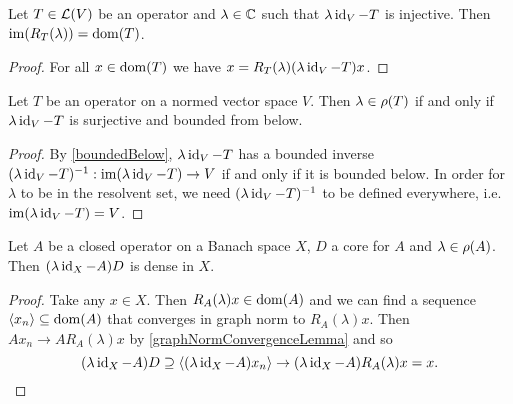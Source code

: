 \begin{lemma}
Let $T\in\operatorname{\mathcal{L}}(V)$ be an operator and $\lambda\in\mathbb{C}$ such that $\lambda\operatorname{id}_V - T$ is injective. Then $\operatorname{im}(R_T(\lambda)) = \operatorname{dom}(T)$.
\end{lemma}
\begin{proof}
For all $x\in \operatorname{dom}(T)$ we have $x = R_T(\lambda)(\lambda\operatorname{id}_V - T)x$.
\end{proof}

\begin{lemma} \label{elementResolventSetNormedSpace}
Let $T$ be an operator on a normed vector space $V$. Then $\lambda \in \rho(T)$ \textup{if and only if} $\lambda \operatorname{id}_V - T$ is surjective and bounded from below.
\end{lemma}
\begin{proof}
By \ref{boundedBelow}, $\lambda \operatorname{id}_V - T$ has a bounded inverse $(\lambda \operatorname{id}_V - T)^{-1}: \operatorname{im}(\lambda \operatorname{id}_V - T)\to V$ if and only if it is bounded below. In order for $\lambda$ to be in the resolvent set, we need $(\lambda \operatorname{id}_V - T)^{-1}$ to be defined everywhere, i.e. $\operatorname{im}(\lambda \operatorname{id}_V - T) = V$.
\end{proof}

\begin{lemma} \label{densityCoreLemma}
Let $A$ be a closed operator on a Banach space $X$, $D$ a core for $A$ and $\lambda\in\rho(A)$. Then $(\lambda\operatorname{id}_X - A)D$ is dense in $X$.
\end{lemma}
\begin{proof}
Take any $x\in X$. Then $R_A(\lambda)x\in \operatorname{dom}(A)$ and we can find a sequence $\left\langle x_n \right\rangle\subseteq \operatorname{dom}(A)$ that converges in graph norm to $R_A(\lambda)x$. Then $Ax_n \to AR_A(\lambda)x$ by \ref{graphNormConvergenceLemma} and so
\[ (\lambda\operatorname{id}_X - A)D \supseteq \left\langle (\lambda\operatorname{id}_X - A)x_n \right\rangle \to (\lambda\operatorname{id}_X - A)R_A(\lambda)x = x. \]
\end{proof}

